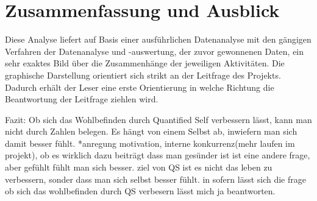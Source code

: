 
\chapter{Zusammenfassung und Ausblick}
\label{ch:Zusammenfassung}

Diese Analyse liefert auf Basis einer ausführlichen Datenanalyse mit den gängigen Verfahren der Datenanalyse und -auswertung, der zuvor gewonnenen Daten, ein sehr exaktes Bild über die Zusammenhänge der jeweiligen Aktivitäten.
Die graphische Darstellung orientiert sich strikt an der Leitfrage des Projekts. 
Dadurch erhält der Leser eine erste Orientierung in welche Richtung die Beantwortung der Leitfrage ziehlen wird.

Fazit:
Ob sich das Wohlbefinden durch Quantified Self verbessern lässt, kann man nicht durch Zahlen belegen. Es hängt von einem Selbst ab, inwiefern man sich damit besser fühlt.
*anregung motivation, interne konkurrenz(mehr laufen im projekt), ob es wirklich dazu beiträgt dass man gesünder ist ist eine andere frage, aber gefühlt fühlt man sich besser.
ziel von QS ist es nicht das leben zu verbessern, sonder dass man sich selbst besser fühlt. in sofern lässt sich die frage ob sich das wohlbefinden durch QS verbesern lässt mich ja beantworten.

